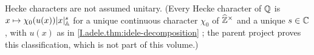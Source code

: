 \begin{definition}
\end{definition}
\noindent Hecke characters are not assumed unitary. (Every Hecke character of $\mathbb{Q}$ is $x\mapsto\chi_0(u(x))\lvert x\rvert_{\mathbb{A}}^s$ for a
unique continuous character $\chi_0$ of $\widehat{\mathbb{Z}}^\times$ and a unique $s\in\mathbb{C}$, with $u(x)$ as in \cref{I.adele.thm:idele-decomposition}
\cite[§2.1]{GH}; the parent project proves this classification, which is not part of this volume.)

